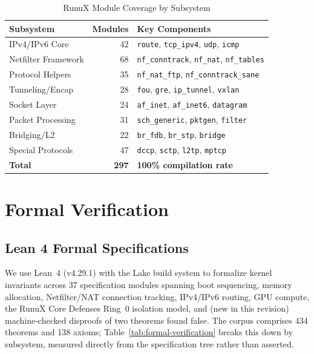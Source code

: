 \documentclass[sigconf,nonacm=false]{acmart}
\begin{document}
\begin{table}[t]
\caption{RunuX Module Coverage by Subsystem}
\label{tab:modules}
\small
\begin{tabular}{lrl}
\toprule
\textbf{Subsystem} & \textbf{Modules} & \textbf{Key Components} \\
\midrule
IPv4/IPv6 Core       & 42  & \texttt{route}, \texttt{tcp\_ipv4}, \texttt{udp}, \texttt{icmp} \\
Netfilter Framework   & 68  & \texttt{nf\_conntrack}, \texttt{nf\_nat}, \texttt{nf\_tables} \\
Protocol Helpers      & 35  & \texttt{nf\_nat\_ftp}, \texttt{nf\_conntrack\_sane} \\
Tunneling/Encap       & 28  & \texttt{fou}, \texttt{gre}, \texttt{ip\_tunnel}, \texttt{vxlan} \\
Socket Layer          & 24  & \texttt{af\_inet}, \texttt{af\_inet6}, \texttt{datagram} \\
Packet Processing     & 31  & \texttt{sch\_generic}, \texttt{pktgen}, \texttt{filter} \\
Bridging/L2           & 22  & \texttt{br\_fdb}, \texttt{br\_stp}, \texttt{bridge} \\
Special Protocols     & 47  & \texttt{dccp}, \texttt{sctp}, \texttt{l2tp}, \texttt{mptcp} \\
\midrule
\textbf{Total}        & \textbf{297} & \textbf{100\% compilation rate} \\
\bottomrule
\end{tabular}
\end{table}

\section{Formal Verification}
\label{sec:verification}

\subsection{Lean 4 Formal Specifications}
We use Lean~4 (v4.29.1) with the Lake build system to formalize kernel invariants across 37 specification modules spanning boot sequencing, memory allocation, Netfilter/NAT connection tracking, IPv4/IPv6 routing, GPU compute, the RunuX Core Defenses Ring~0 isolation model, and (new in this revision) machine-checked disproofs of two theorems found false. The corpus comprises 434 theorems and 138 axioms; Table~\ref{tab:formal-verification} breaks this down by subsystem, measured directly from the specification tree rather than asserted.
\end{document}
